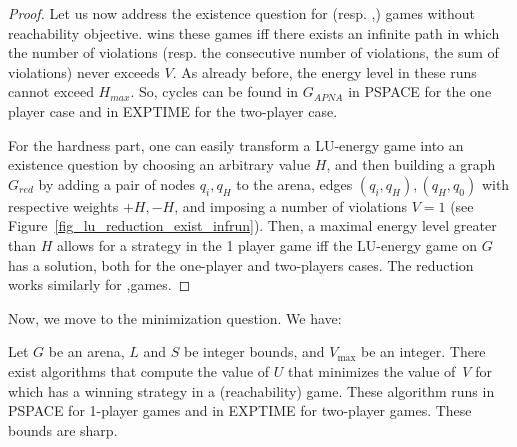 \begin{proof}
\vskip 0.3cm
Let us now address the existence question for \LVenergynb (resp. \LVenergyconsnb,\LVenergysum)  games without reachability objective.  wins these games iff there exists an infinite path in which the number of violations (resp. the consecutive number of violations, the sum of violations) never exceeds $V$. As already before, the energy level in these runs cannot exceed $H_{max}$. So, cycles can be found in $G_{APNA}$ in PSPACE for the one player case and in EXPTIME for the two-player case. 

\vskip 0.2cm
For the hardness part, one can easily transform a LU-energy game into an existence question by choosing an arbitrary value $H$, and then building a graph $G_{red}$ by adding a pair of nodes $q_i,q_H$ to the arena, edges $(q_i,q_H), (q_H,q_0)$ with respective weights $+H,-H$, and imposing a number of violations $V=1$ (see Figure~\ref{fig_lu_reduction_exist_infrun}). Then, a maximal energy level greater than $H$ allows for a strategy in the 1 player \LVenergynb game iff the LU-energy game on $G$ has a solution, both for the one-player and two-players cases. 
The reduction works similarly for \LVenergyconsnb,\LVenergysum games.



\end{proof} 
\vskip 1cm

Now, we move to the minimization question. We have:
\begin{theorem}
\label{thm_minimization}
Let $G$ be an arena, $L$ and $S$ be integer bounds, and $V_{\max}$
be an integer. There exist algorithms that compute the value of $U$
that minimizes the value of~$V$ for which  has a winning
strategy in a \LVenergyall(reachability) game.  These algorithm runs in PSPACE for 1-player games and in EXPTIME for two-player games. These bounds are sharp.
\end{theorem}

